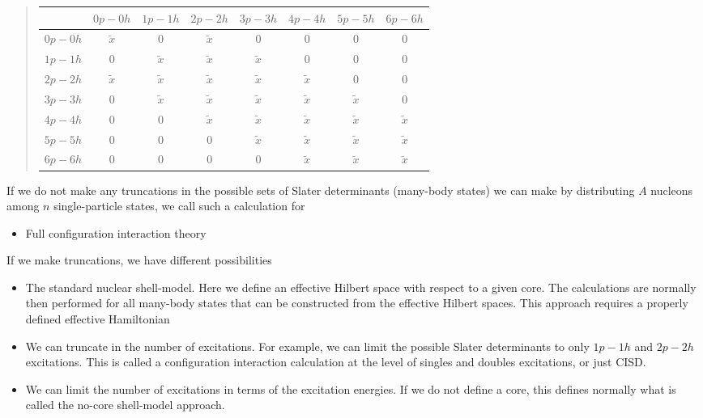 \begin{quote}
\begin{tabular}{cccccccc}
\hline
\multicolumn{1}{c}{  } & \multicolumn{1}{c}{ $0p-0h$ } & \multicolumn{1}{c}{ $1p-1h$ } & \multicolumn{1}{c}{ $2p-2h$ } & \multicolumn{1}{c}{ $3p-3h$ } & \multicolumn{1}{c}{ $4p-4h$ } & \multicolumn{1}{c}{ $5p-5h$ } & \multicolumn{1}{c}{ $6p-6h$ } \\
\hline
$0p-0h$ & $\tilde{x}$ & 0           & $\tilde{x}$ & 0           & 0           & 0           & 0           \\
$1p-1h$ & 0           & $\tilde{x}$ & $\tilde{x}$ & $\tilde{x}$ & 0           & 0           & 0           \\
$2p-2h$ & $\tilde{x}$ & $\tilde{x}$ & $\tilde{x}$ & $\tilde{x}$ & $\tilde{x}$ & 0           & 0           \\
$3p-3h$ & 0           & $\tilde{x}$ & $\tilde{x}$ & $\tilde{x}$ & $\tilde{x}$ & $\tilde{x}$ & 0           \\
$4p-4h$ & 0           & 0           & $\tilde{x}$ & $\tilde{x}$ & $\tilde{x}$ & $\tilde{x}$ & $\tilde{x}$ \\
$5p-5h$ & 0           & 0           & 0           & $\tilde{x}$ & $\tilde{x}$ & $\tilde{x}$ & $\tilde{x}$ \\
$6p-6h$ & 0           & 0           & 0           & 0           & $\tilde{x}$ & $\tilde{x}$ & $\tilde{x}$ \\
\hline
\end{tabular}
\end{quote}

\noindent
If we do not make any truncations in the possible sets of Slater determinants (many-body states) we can make by distributing $A$ nucleons among $n$ single-particle states, we call such a calculation for 
\begin{itemize}
\item Full configuration interaction theory
\end{itemize}

\noindent
If we make truncations, we have different possibilities

\begin{itemize}
\item The standard nuclear shell-model. Here we define an effective Hilbert space with respect to a given core. The calculations are normally then performed for all many-body states that can be constructed from the effective Hilbert spaces. This approach requires a properly defined effective Hamiltonian

\item We can truncate in the number of excitations. For example, we can limit the possible Slater determinants to only $1p-1h$ and $2p-2h$ excitations. This is called a configuration interaction calculation at the level of singles and doubles excitations, or just CISD. 

\item We can limit the number of excitations in terms of the excitation energies. If we do not define a core, this defines normally what is called the no-core shell-model approach. 
\end{itemize}

